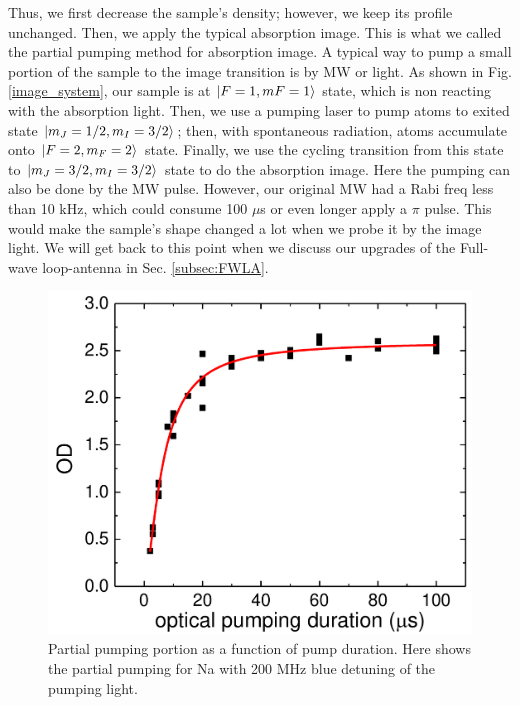 Thus, we first decrease the sample's density; however, we keep its profile unchanged. Then, we apply the typical absorption image. This is what we called the partial pumping method for absorption image. A typical way to pump a small portion of the sample to the image transition is by MW or light. As shown in Fig. \ref{image_system}, our sample is at $\ket{F=1,mF=1}$ state, which is non reacting with the absorption light. Then, we use a pumping laser to pump atoms to exited state $\ket{m_J=1/2,m_I=3/2}$; then, with spontaneous radiation, atoms accumulate onto $\ket{F=2,m_F=2}$ state. Finally, we use the cycling transition from this state to $\ket{m_J=3/2,m_I=3/2}$ state to do the absorption image. Here the pumping can also be done by the MW pulse. However, our original MW had a Rabi freq less than 10 kHz, which could consume 100 $\mu$s or even longer apply a $\pi$ pulse. This would make the sample's shape changed a lot when we probe it by the image light. We will get back to this point when we discuss our upgrades of the Full-wave loop-antenna in Sec. \ref{subsec:FWLA}. 

\begin{figure}[htb]
\begin{center}
\includegraphics[width = 0.8\linewidth]{figures/partial_pumping.pdf}
\end{center}
\caption[Partial pumping portion as function of pump duration]{Partial pumping portion as a function of pump duration. Here shows the partial pumping for Na with 200 MHz blue detuning of the pumping light.}
\label{partial_pumping}
\end{figure}

